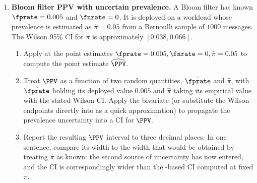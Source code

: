 \begin{enumerate}
\item \exstarstar
\label{ex:ch7-8}
\textbf{Bloom filter PPV with uncertain prevalence.}
A Bloom filter has known $\fprate = 0.005$ and $\fnrate = 0$. It is
deployed on a workload whose prevalence is estimated as
$\hat\pi = 0.05$ from a Bernoulli sample of $1000$ messages. The
Wilson 95\% CI for $\pi$ is approximately $[0.038, 0.066]$.
\begin{enumerate}
  \item[(a)] Apply  at the point estimates
    $\fprate = 0.005, \fnrate = 0, \hat\pi = 0.05$ to compute the
    point estimate $\widehat{\PPV}$.
  \item[(b)] Treat $\PPV$ as a function of two random quantities,
    $\hat\fprate$ and $\hat\pi$, with $\hat\fprate$ holding its
    deployed value $0.005$ and $\hat\pi$ taking its empirical
    value with the stated Wilson CI. Apply the bivariate
     (or substitute the Wilson endpoints
    directly into  as a quick approximation) to
    propagate the prevalence uncertainty into a CI for $\PPV$.
  \item[(c)] Report the resulting $\PPV$ interval to three decimal
    places. In one sentence, compare its width to the width that
    would be obtained by treating $\hat\pi$ as known: the second
    source of uncertainty has now entered, and the CI is
    correspondingly wider than the
    -based CI computed at fixed $\pi$.
\end{enumerate}



\end{enumerate}
